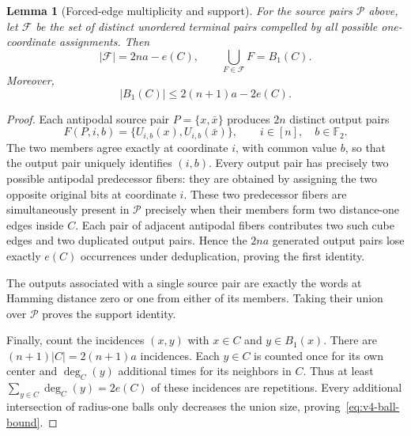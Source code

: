 \documentclass[11pt,a4paper]{article}
\newtheorem{lemma}[theorem]{Lemma}
\begin{document}
\begin{lemma}[Forced-edge multiplicity and support]\label{lem:v4-edge-identity}
For the source pairs $\mathcal P$ above, let $\mathcal F$ be the set of distinct unordered terminal pairs compelled by all possible one-coordinate assignments. Then
\begin{equation}\label{eq:v4-forced-count}
 \boxed{\quad |\mathcal F|=2na-e(C),\qquad
    \bigcup_{F\in\mathcal F}F=B_1(C).\quad}
\end{equation}
Moreover,
\begin{equation}\label{eq:v4-ball-bound}
 \boxed{\quad |B_1(C)|\le2(n+1)a-2e(C).\quad}
\end{equation}
\end{lemma}
\begin{proof}
Each antipodal source pair $P=\{x,\bar x\}$ produces $2n$ distinct output pairs
\[
 F(P,i,b)=\{U_{i,b}(x),U_{i,b}(\bar x)\},\qquad
 i\in[n],\quad b\in\mathbb F_2.
\]
The two members agree exactly at coordinate $i$, with common value $b$, so that the output pair uniquely identifies $(i,b)$. Every output pair has precisely two possible antipodal predecessor fibers: they are obtained by assigning the two opposite original bits at coordinate $i$. These two predecessor fibers are simultaneously present in $\mathcal P$ precisely when their members form two distance-one edges inside $C$. Each pair of adjacent antipodal fibers contributes two such cube edges and two duplicated output pairs. Hence the $2na$ generated output pairs lose exactly $e(C)$ occurrences under deduplication, proving the first identity.

The outputs associated with a single source pair are exactly the words at Hamming distance zero or one from either of its members. Taking their union over $\mathcal P$ proves the support identity.

Finally, count the incidences $(x,y)$ with $x\in C$ and $y\in B_1(x)$. There are $(n+1)|C|=2(n+1)a$ incidences. Each $y\in C$ is counted once for its own center and $\deg_C(y)$ additional times for its neighbors in $C$. Thus at least $\sum_{y\in C}\deg_C(y)=2e(C)$ of these incidences are repetitions. Every additional intersection of radius-one balls only decreases the union size, proving~\eqref{eq:v4-ball-bound}.
\end{proof}
\end{document}
